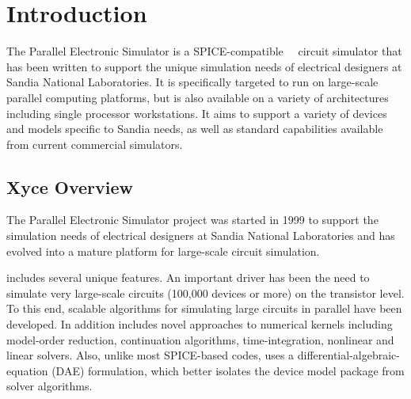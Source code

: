 



\chapter{Introduction}
\label{Introduction}

{
The \XyceTM{} Parallel Electronic Simulator is a
SPICE-compatible~\cite{NagelRohrer}~\cite{Spice3f5-user-guide}
circuit simulator that has been written to support
the unique simulation needs of electrical designers at Sandia National
Laboratories.  It is specifically targeted 
to run on large-scale parallel computing
 platforms, but is also available on a variety
of architectures including single processor workstations.  It aims to
support a variety of devices and models specific to Sandia needs, as well
as standard capabilities available from current commercial simulators.
}
\section{Xyce Overview}
\label{Xyce_Overview}

The \Xyce{} Parallel Electronic Simulator project was started in 1999
to support the simulation needs of electrical designers at Sandia
National Laboratories and has evolved into a mature platform for large-scale
circuit simulation.

\Xyce{} includes several unique features.  An important driver 
has been the need to simulate very large-scale
circuits (100,000 devices or more) on the transistor level.  To this end,
scalable algorithms for simulating large circuits in parallel have been
developed.  In addition \Xyce{} includes novel 
approaches to numerical kernels including model-order reduction, continuation algorithms, 
time-integration, nonlinear and linear solvers.  Also, unlike most SPICE-based codes, 
\Xyce{} uses a differential-algebraic-equation (DAE) formulation, which better isolates the 
device model package from solver algorithms. 

